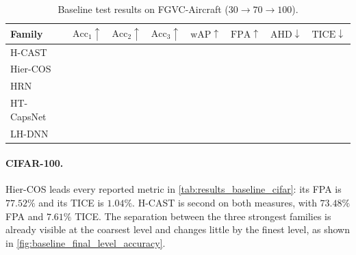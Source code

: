 \begin{table}[htbp]
\centering
\caption{Baseline test results on FGVC-Aircraft ($30\to70\to100$).}
\label{tab:results_baseline_aircraft}
\resulttablesetup
\begin{tabularx}{\linewidth}{@{}L{2.2cm}|CCC|C|C|C|C@{}}
\toprule
\textbf{Family} & $\mathrm{Acc}_1\uparrow$ & $\mathrm{Acc}_2\uparrow$ & $\mathrm{Acc}_3\uparrow$ & $\mathrm{wAP}\uparrow$ & $\mathrm{FPA}\uparrow$ & $\mathrm{AHD}\downarrow$ & $\mathrm{TICE}\downarrow$ \\
\midrule
H-CAST    &  &  &  &  &  &  &  \\
Hier-COS  &  &  &  &  &  &  &  \\
HRN       &  &  &  &  &  &  &  \\
HT-CapsNet &  &  &  &  &  &  &  \\
LH-DNN    &  &  &  &  &  &  &  \\
\bottomrule
\end{tabularx}
\end{table}

\FloatBarrier

\paragraph{CIFAR-100.} Hier-COS leads every reported metric in
\cref{tab:results_baseline_cifar}: its FPA is $77.52\%$ and its TICE is
$1.04\%$. H-CAST is second on both measures, with $73.48\%$ FPA and $7.61\%$
TICE. The separation between the three strongest families is already visible at
the coarsest level and changes little by the finest level, as shown in
\cref{fig:baseline_final_level_accuracy}.

